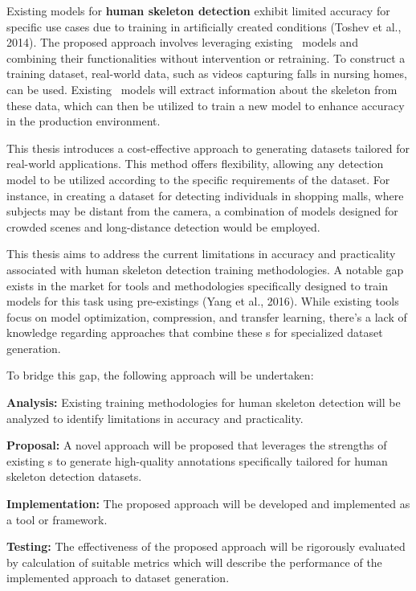 Existing models for {\bf human skeleton detection} exhibit limited accuracy for specific use cases due to training in artificially created conditions (\scc Toshev et al., 2014). The proposed approach involves leveraging existing \NN\ models and combining their functionalities without intervention or retraining. To construct a training dataset, real-world data, such as videos capturing falls in nursing homes, can be used. Existing \NN\ models will extract information about the skeleton from these data, which can then be utilized to train a new model to enhance accuracy in the production environment.

This thesis introduces a cost-effective approach to generating datasets tailored for real-world applications. This method offers flexibility, allowing any detection model to be utilized according to the specific requirements of the dataset. For instance, in creating a dataset for detecting individuals in shopping malls, where subjects may be distant from the camera, a combination of models designed for crowded scenes and long-distance detection would be employed.

This thesis aims to address the current limitations in accuracy and practicality associated with human skeleton detection training methodologies. A notable gap exists in the market for tools and methodologies specifically designed to train models for this task using pre-existing\NN\-s (\scc Yang et al., 2016). While existing tools focus on model optimization, compression, and transfer learning, there's a lack of knowledge regarding approaches that combine these \NN\-s for specialized dataset generation.

To bridge this gap, the following approach will be undertaken:

\startitemize[n]
    \item {\bf Analysis:} Existing training methodologies for human skeleton detection will be analyzed to identify limitations in accuracy and practicality.
    \item {\bf Proposal:} A novel approach will be proposed that leverages the strengths of existing \NN\-s to generate high-quality annotations specifically tailored for human skeleton detection datasets.
    \item {\bf Implementation:} The proposed approach will be developed and implemented as a tool or framework.
    \item {\bf Testing:} The effectiveness of the proposed approach will be rigorously evaluated by calculation of suitable metrics which will describe the performance of the implemented approach to dataset generation.
\stopitemize
